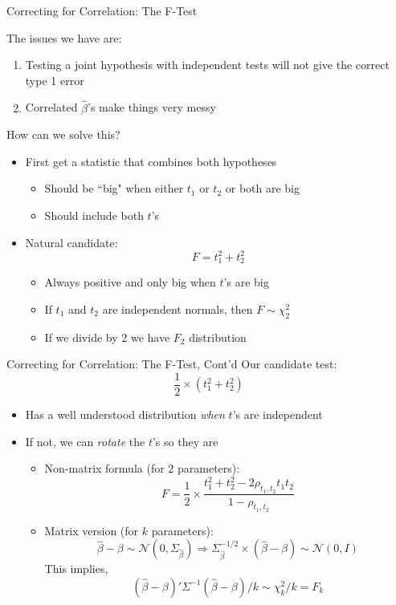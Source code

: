 \begin{frame}{Correcting for Correlation: The F-Test}

The issues we have are:
\begin{enumerate}
	\item Testing a joint hypothesis with independent tests will not give the correct type 1 error
	\item Correlated $\hat\beta$'s make things very messy	
\end{enumerate}

 How can we solve this?

\begin{itemize}
	\item First get a statistic that combines both hypotheses
		\begin{itemize}
			\item Should be ``big" when either $t_1$ or $t_2$ or both are big
			\item Should include both $t$'s
		\end{itemize}
	\item Natural candidate:
		\[
			F = t_1^2 + t_2^2
		\]
	\begin{itemize}
		\item Always positive and only big when $t$'s are big
		\item If $t_1$ and $t_2$ are independent normals, then $F\sim \chi^2_2$
		\item If we divide by 2 we have $F_2$ distribution
	\end{itemize}
\end{itemize}	
\end{frame}

\begin{frame}{Correcting for Correlation: The F-Test, Cont'd}
Our candidate test:
	\[
		\frac{1}{2}\times (t_1^2 + t_2^2)
	\]

\begin{itemize}
	\item Has a well understood distribution \emph{when} $t$'s are independent
	\item If not, we can \emph{rotate} the $t$'s so they are
	\begin{itemize}
		\item Non-matrix formula (for 2 parameters):
		\[
			F = \frac{1}{2}\times\frac{t_1^2 + t_2^2 - 2\rho_{t_1,t_2}t_1t_2}{1-\rho_{t_1,t_2}}
		\]
		\item Matrix version (for $k$ parameters):
		\[
			\hat\beta-\beta\sim\mathcal{N}\left(0,\Sigma_{\hat\beta}\right)\Rightarrow \Sigma_{\hat\beta}^{-1/2}\times\left(\hat\beta-\beta\right)\sim\mathcal{N}(0,I)
		\]
		This implies,
		\[
		(\hat\beta-\beta)'\Sigma^{-1}(\hat\beta-\beta)/k\sim\chi^2_k/k = F_k
		\]
		
		
	\end{itemize}	
\end{itemize}	
\end{frame}

